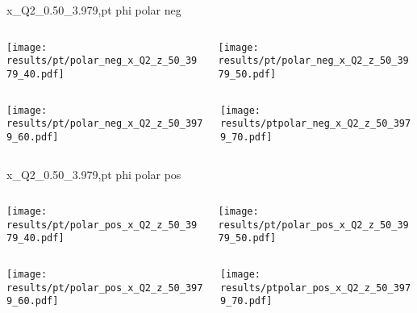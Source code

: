 \begin{frame}{x\_Q2\_0.50\_3.979,pt phi polar neg}
\begin{columns}
\begin{column}[T]{0.5\textwidth}
\texttt{[image: results/pt/polar\_neg\_x\_Q2\_z\_50\_3979\_40.pdf]}
\end{column}
\begin{column}[T]{0.5\textwidth}
\texttt{[image: results/pt/polar\_neg\_x\_Q2\_z\_50\_3979\_50.pdf]}
\end{column}
\end{columns}
\begin{columns}
\begin{column}[T]{0.5\textwidth}
\texttt{[image: results/pt/polar\_neg\_x\_Q2\_z\_50\_3979\_60.pdf]}
\end{column}
\begin{column}[T]{0.5\textwidth}
\texttt{[image: results/ptpolar\_neg\_x\_Q2\_z\_50\_3979\_70.pdf]}
\end{column}
\end{columns}
\end{frame}
\begin{frame}{x\_Q2\_0.50\_3.979,pt phi polar pos}
\begin{columns}
\begin{column}[T]{0.5\textwidth}
\texttt{[image: results/pt/polar\_pos\_x\_Q2\_z\_50\_3979\_40.pdf]}
\end{column}
\begin{column}[T]{0.5\textwidth}
\texttt{[image: results/pt/polar\_pos\_x\_Q2\_z\_50\_3979\_50.pdf]}
\end{column}
\end{columns}
\begin{columns}
\begin{column}[T]{0.5\textwidth}
\texttt{[image: results/pt/polar\_pos\_x\_Q2\_z\_50\_3979\_60.pdf]}
\end{column}
\begin{column}[T]{0.5\textwidth}
\texttt{[image: results/ptpolar\_pos\_x\_Q2\_z\_50\_3979\_70.pdf]}
\end{column}
\end{columns}
\end{frame}
